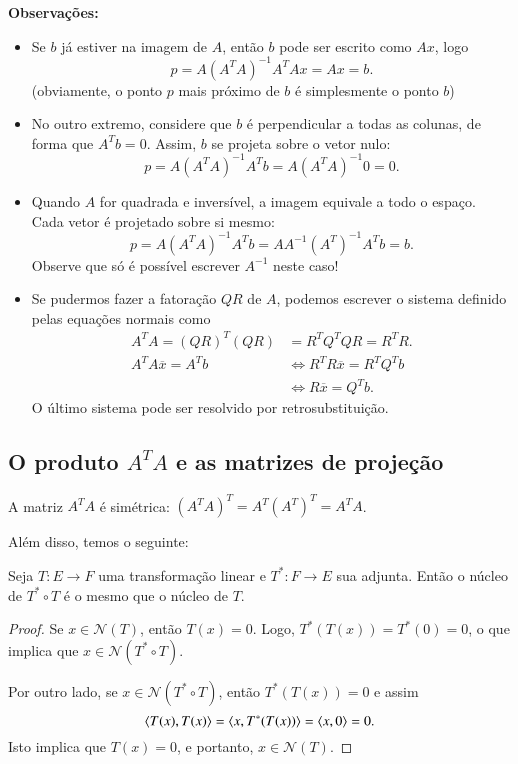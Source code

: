{\bf Observações:}

\begin{itemize}
	\item Se $b$ já estiver na imagem de $A$, então $b$ pode ser escrito como $Ax$, logo
	\begin{equation*}
    	p = A(A^TA)^{-1}A^TAx = Ax=b.
	\end{equation*}
	(obviamente, o ponto $p$ mais próximo de $b$ é simplesmente o ponto $b$)
	\item No outro extremo, considere que $b$ é perpendicular a todas as colunas, de forma que $A^Tb=0$. Assim, $b$ se projeta sobre o vetor nulo:
    \begin{equation*}
    	p = A(A^TA)^{-1}A^Tb = A(A^TA)^{-1}0 = 0.
    \end{equation*}
	\item Quando $A$ for quadrada e inversível, a imagem equivale a todo o espaço. Cada vetor é projetado sobre si mesmo:
    \begin{equation*}
    	p = A(A^TA)^{-1}A^Tb = AA^{-1}(A^T)^{-1}A^Tb = b.
    \end{equation*}
	Observe que só é possível escrever $A^{-1}$ neste caso!
    \item Se pudermos fazer a fatoração $QR$ de $A$, podemos escrever o sistema definido pelas equações normais como
	\begin{align*}
	A^TA = (QR)^T(QR) &= R^TQ^TQR = R^TR.\\
	A^TA\overline{x} = A^Tb &\Leftrightarrow R^TR\overline{x} = R^TQ^Tb\\
	& \Leftrightarrow R\overline{x} = Q^Tb.  
	\end{align*}
	O último sistema pode ser resolvido por retrosubstituição.
\end{itemize}

\subsection{O produto $A^TA$ e as matrizes de projeção}

A matriz $A^TA$ é simétrica: $(A^TA)^T = A^T(A^T)^T = A^TA$. 

Além disso, temos o seguinte:

\begin{lema}
	Seja $T:E\to F$ uma transformação linear e $T^*:F\to E$ sua adjunta. Então o núcleo de $T^*\circ T$ é o mesmo que o núcleo de $T$.
\end{lema}
\begin{proof}
	Se $x \in {\mathcal{N}}(T)$, então $T(x)=0$. Logo, $T^*(T(x))=T^*(0)=0$, o que implica que $x \in {\mathcal{N}}(T^*\circ T)$.

Por outro lado, se $x\in {\mathcal{N}}(T^*\circ T)$, então $T^*(T(x))=0$ e assim
\begin{equation*}
	\langle T(x), T(x) \rangle=\langle x, T^*(T(x)) \rangle = \langle x, 0 \rangle = 0.
\end{equation*}
Isto implica que $T(x)=0$, e portanto, $x\in {\mathcal{N}}(T)$.
\end{proof}

